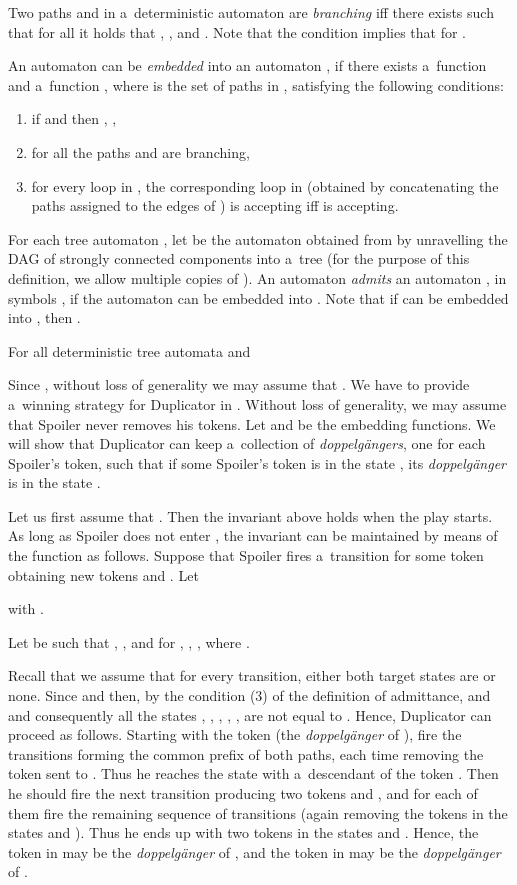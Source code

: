 \documentclass{LMCS}
\begin{document}
Two paths  and   in a~deterministic automaton  are {\em branching} iff there exists  such that for all  it holds that ,  , and . Note that the condition implies that  for . 

An automaton  can be {\em embedded} into an automaton , if there exists a~function  and a~function , where  is the set of paths in , satisfying the following conditions:
\begin{enumerate}[(1)]
\item if  and  then , ,
\item for all  the paths  and  are branching,
\item for every loop  in , the corresponding loop in  (obtained by concatenating the paths assigned to the edges of ) is accepting iff  is accepting. 
\end{enumerate}

For each tree automaton , let  be the automaton obtained from  by unravelling the DAG of strongly connected components into a~tree (for the purpose of this definition, we allow multiple copies of ). An automaton  {\em admits} an automaton , in symbols , if the automaton  can be embedded into . Note that if  can be embedded into , then .

\begin{lem} \label{admittance}
For all deterministic tree automata  and  
\end{lem} 

\proof Since , without loss of generality we may assume that . We have to provide a~winning strategy for Duplicator in . Without loss of generality, we may assume that Spoiler never removes his tokens. Let   and  be the embedding functions.  We will show that Duplicator can keep a~collection of {\em doppelg\"angers}, one for each Spoiler's token, such that if some Spoiler's token  is in the state , its {\em doppelg\"anger}  is in the state . 

Let us first assume that . Then the invariant above holds when the play starts. As long as Spoiler does not enter , the invariant can be maintained by means of the function  as follows. Suppose that Spoiler fires a~transition   for some token  obtaining new tokens  and . Let  

with . 
 
Let  be such that , , and  for , , , where .

Recall that we assume that for every transition, either both target states are  or none.  Since  and  then, by the condition (3) of the definition of admittance,  and  and consequently all the states , ,  , , ,  are not equal to . Hence, Duplicator can proceed as follows. Starting with the token  (the {\em doppelg\"anger} of ), fire the transitions forming the common prefix of both paths, each time removing the token sent to . Thus he reaches the state  with a~descendant of the token . Then he should fire the next transition producing two tokens  and , and  for each of them fire the remaining sequence of transitions (again removing the tokens in the states  and ). Thus he ends up with two tokens in the states  and . Hence, the token in  may be the {\em doppelg\"anger} of , and the token in  may be the {\em doppelg\"anger} of .
\end{document}
